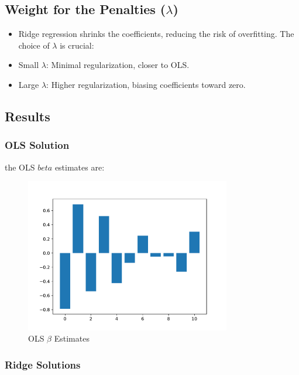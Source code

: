 \subsection*{Weight for the Penalties ($\lambda$)}
\begin{itemize}
    \item Ridge regression shrinks the coefficients, reducing the risk of overfitting. The choice of $\lambda$ is crucial: 
    \item Small $\lambda$: Minimal regularization, closer to OLS.
    \item Large $\lambda$: Higher regularization, biasing coefficients toward zero.
\end{itemize}

\subsection*{Results}

\subsubsection*{OLS Solution}

the OLS $beta$ estimates  are:

\begin{figure}[h]
    \centering
    \includegraphics[width=0.8\textwidth]{code/figures/ols_beta.pdf}
    \caption{OLS $\beta$ Estimates}
\end{figure}


\subsubsection*{Ridge Solutions}

